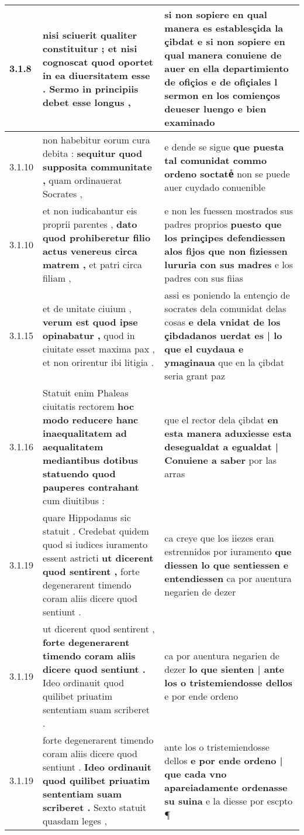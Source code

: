 \begin{tabular}{|p{1cm}|p{6.5cm}|p{6.5cm}|}
3.1.8 & nisi sciuerit qualiter constituitur ; \textbf{ et nisi cognoscat quod oportet in ea diuersitatem esse . } Sermo in principiis debet esse longus , & si non sopiere en qual manera es establesçida la çibdat \textbf{ e si non sopiere en qual manera conuiene de auer en ella departimiento de ofiçios e de ofiçiales } l sermon en los comienços deueser luengo e bien examinado \\\hline
3.1.10 & non habebitur eorum cura debita : \textbf{ sequitur quod supposita communitate , } quam ordinauerat Socrates , & e dende se sigue \textbf{ que puesta tal comunidat commo ordeno soctateᷤ } non se puede auer cuydado conuenible \\\hline
3.1.10 & et non iudicabantur eis proprii parentes , \textbf{ dato quod prohiberetur filio actus venereus circa matrem , } et patri circa filiam , & e non les fuessen mostrados sus padres proprios \textbf{ puesto que los prinçipes defendiessen alos fijos que non fiziessen lururia con sus madres } e los padres con sus fiias \\\hline
3.1.15 & et de unitate ciuium , \textbf{ verum est quod ipse opinabatur , } quod in ciuitate esset maxima pax , et non orirentur ibi litigia . & assi es poniendo la entençio de socrates dela comunidat delas cosas \textbf{ e dela vnidat de los çibdadanos uerdat es | lo que el cuydaua e ymaginaua } que en la çibdat seria grant paz \\\hline
3.1.16 & Statuit enim Phaleas ciuitatis rectorem \textbf{ hoc modo reducere hanc inaequalitatem ad aequalitatem mediantibus dotibus statuendo quod pauperes contrahant } cum diuitibus : & que el rector dela çibdat \textbf{ en esta manera aduxiesse esta desegualdat a egualdat | Conuiene a saber } por las arras \\\hline
3.1.19 & quare Hippodanus sic statuit . Credebat quidem quod si iudices iuramento essent astricti \textbf{ ut dicerent quod sentirent , } forte degenerarent timendo coram aliis dicere quod sentiunt . & ca creye que los iiezes eran estrennidos por iuramento \textbf{ que diessen lo que sentiessen e entendiessen } ca por auentura negarien de dezer \\\hline
3.1.19 & ut dicerent quod sentirent , \textbf{ forte degenerarent timendo coram aliis dicere quod sentiunt . } Ideo ordinauit quod quilibet priuatim sententiam suam scriberet . & ca por auentura negarien de dezer \textbf{ lo que sienten | ante los o tristemiendosse dellos } e por ende ordeno \\\hline
3.1.19 & forte degenerarent timendo coram aliis dicere quod sentiunt . \textbf{ Ideo ordinauit quod quilibet priuatim sententiam suam scriberet . } Sexto statuit quasdam leges , & ante los o tristemiendosse dellos \textbf{ e por ende ordeno | que cada vno apareiadamente ordenasse su suina } e la diesse por escpto ¶ \\\hline

\end{tabular}
